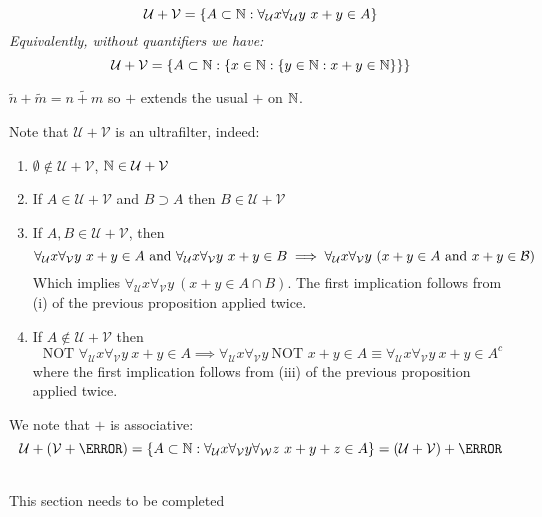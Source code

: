 \documentclass[a4paper]{article}
\renewcommand{\U}{\mathcal{U}}
\renewcommand{\V}{\mathcal{V}}
\begin{document}
  \begin{defi}[$+$]\index{$+$}
    \[\U + \V = \{ A \subset \N : \forall_{\U} x \forall_{\U} y \ x+y \in A \}\]
    \textit{Equivalently, without quantifiers we have:}
    \[\U + \V = \{ A \subset \N : \{ x \in \N : \{ y \in \N :
      x + y \in \N\} \} \} \]
  \end{defi}
  \begin{eg}
    $\tilde{n} + \tilde{m} = \tilde{n+m}$ so $+$ extends the
    usual $+$ on $\mathbb{N}$.
  \end{eg}
  Note that $\U + \V$ is an ultrafilter, indeed:
  \begin{enumerate}
  \item $\emptyset \not\in \U + \V$, $\N \in \U + \V$
  \item If $A \in \U + \V$ and $B \supset A$ then $B \in \U+\V$
  \item If $A, B \in \U + \V$, then
    \[\forall_{\U} x \forall_{\V} y \ x+y \in A \text{ and } \forall_{\U} x
      \forall_{\V} y \ x+y \in B  \implies \forall_{\U} x \forall_{\V} y \ ( x+y
      \in A \text{ and } x+y \in \B)\]
    Which implies $\forall_{\U} x \forall_{\V} y \ (x + y \in A \cap B)$. The
    first implication follows from (i) of the previous proposition applied twice.

  \item If $A \not\in \U + \V$ then
    \[\text{NOT } \forall_{\U} x \forall_{\V} y \ x+y \in A \implies
      \forall_{\U} x \forall_{\V} y \ \text{NOT }x+y \in A \equiv \forall_{\U}
      x \forall_{\V} y \ x+ y \in A^c\]
    where the first implication follows from (iii) of the previous proposition
    applied twice.
  \end{enumerate}
  
  We note that $+$ is associative:
  \[\U + (\V + \W) = \{ A \subset \N : \forall_{\U} x \forall_{\V} y
    \forall_{\mathcal{W}} z \ x+y+z \in A\} = (\U + \V) + \W \]
  

  \\ This section needs to be completed
\end{document}
